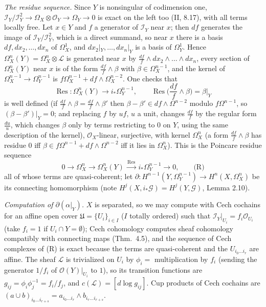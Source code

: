 \documentclass[11pt]{article}
\begin{document}
\emph{The residue sequence.} Since $Y$ is nonsingular of codimension one, $\mathcal I_Y/\mathcal I_Y^2\to\Omega_X\otimes\mathcal O_Y\to\Omega_Y\to0$ is exact on the left too (II, 8.17), with all terms locally free. Let $x\in Y$ and $f$ a generator of $\mathcal I_Y$ near $x$; then $df$ generates the image of $\mathcal I_Y/\mathcal I_Y^2$, which is a direct summand, so near $x$ there is a basis $df,dx_2,\dots,dx_n$ of $\Omega^1_X$, and $dx_2|_Y,\dots,dx_n|_Y$ is a basis of $\Omega_Y^1$. Hence $\Omega^n_X(Y)=\Omega^n_X\otimes\mathcal L$ is generated near $x$ by $\frac{df}{f}\wedge dx_2\wedge\dots\wedge dx_n$, every section of $\Omega^n_X(Y)$ near $x$ is of the form $\frac{df}f\wedge\beta$ with $\beta\in\Omega^{n-1}_X$, and the kernel of $\Omega^{n-1}_X\to\Omega^{n-1}_Y$ is $f\Omega^{n-1}_X+df\wedge\Omega^{n-2}_X$. One checks that
\[
\operatorname{Res}\colon\Omega^n_X(Y)\to i_*\Omega^{n-1}_Y,\qquad \operatorname{Res}\Big(\frac{df}{f}\wedge\beta\Big)=\beta|_Y
\]
is well defined (if $\frac{df}f\wedge\beta=\frac{df}f\wedge\beta'$ then $\beta-\beta'\in df\wedge\Omega^{n-2}$ modulo $f\Omega^{n-1}$, so $(\beta-\beta')|_Y=0$; and replacing $f$ by $uf$, $u$ a unit, changes $\frac{df}{f}$ by the regular form $\frac{du}u$, which changes $\beta$ only by terms restricting to $0$ on $Y$, using the same description of the kernel), $\mathcal O_X$-linear, surjective, with kernel $\Omega^n_X$ (a form $\frac{df}{f}\wedge\beta$ has residue $0$ iff $\beta\in f\Omega^{n-1}+df\wedge\Omega^{n-2}$ iff it lies in $\Omega^n_X$). This is the Poincare residue sequence
\[
0\to\Omega^n_X\to\Omega^n_X(Y)\xrightarrow{\ \operatorname{Res}\ }i_*\Omega^{n-1}_Y\to0 ,\qquad\text{(R)}
\]
all of whose terms are quasi-coherent; let $\partial\colon H^{n-1}(Y,\Omega^{n-1}_Y)\to H^n(X,\Omega^n_X)$ be its connecting homomorphism (note $H^{j}(X,i_*\mathcal G)=H^j(Y,\mathcal G)$, Lemma 2.10).

\emph{Computation of $\partial(\alpha|_Y)$.} $X$ is separated, so we may compute with Cech cochains for an affine open cover $\mathfrak U=\{U_i\}_{i\in I}$ ($I$ totally ordered) such that $\mathcal I_Y|_{U_i}=f_i\mathcal O_{U_i}$ (take $f_i=1$ if $U_i\cap Y=\emptyset$); Cech cohomology computes sheaf cohomology compatibly with connecting maps (Thm.~4.5), and the sequence of Cech complexes of (R) is exact because the terms are quasi-coherent and the $U_{i_0\dots i_r}$ are affine. The sheaf $\mathcal L$ is trivialized on $U_i$ by $\phi_i=$ multiplication by $f_i$ (sending the generator $1/f_i$ of $\mathcal O(Y)|_{U_i}$ to $1$), so its transition functions are $g_{ij}=\phi_i\phi_j^{-1}=f_i/f_j$, and $c(\mathcal L)=[d\log g_{ij}]$. Cup products of Cech cochains are $(a\cup b)_{i_0\dots i_{r+s}}=a_{i_0\dots i_r}\wedge b_{i_r\dots i_{r+s}}$.
\end{document}
